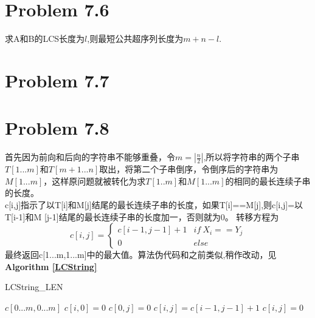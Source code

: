 \documentclass[onecolumn]{ctexart}
\begin{document}
\section*{Problem 7.6}
\indent 求A和B的LCS长度为$l$,则最短公共超序列长度为$m+n-l$.\\

\section*{Problem 7.7}

\section*{Problem 7.8}
\indent 首先因为前向和后向的字符串不能够重叠，令$m=|\frac{n}{2}|$,所以将字符串的两个子串$T[1...m]$和$T[m+1...n]$取出，将第二个子串倒序，令倒序后的字符串为$M[1...m]$，这样原问题就被转化为求$T[1..m]$和$M[1...m]$的相同的最长连续子串的长度。\\
\indent c[i,j]指示了以T[i]和M[j]结尾的最长连续子串的长度，如果T[i]==M[j],则c[i,j]=以T[i-1]和M
[j-1]结尾的最长连续子串的长度加一，否则就为0。
\indent 转移方程为
\[
c[i,j]=
\begin{cases}
c[i-1,j-1]+1 &if\ X_i==Y_j\\
0 &else
\end{cases}
\] 
\indent 最终返回c[1...m,1...m]中的最大值。算法伪代码和之前类似,稍作改动，见\textbf{Algorithm \ref{LCString}}
\begin{algorithm}[htbp]
	\caption{LCString\_LEN}
	\label{LCString}
	\begin{algorithmic}[1]
		\STATE $c[0...m,0...m]$
		\STATE $c[i,0]=0$
		\ENDFOR
		\STATE $c[0,j]=0$
		\ENDFOR	
			\STATE $c[i,j]=c[i-1,j-1]+1$
		\ELSE
			\STATE $c[i,j]=0$
		\ENDIF
		\ENDFOR
		\ENDFOR
	\end{algorithmic}
\end{algorithm}
\end{document}
